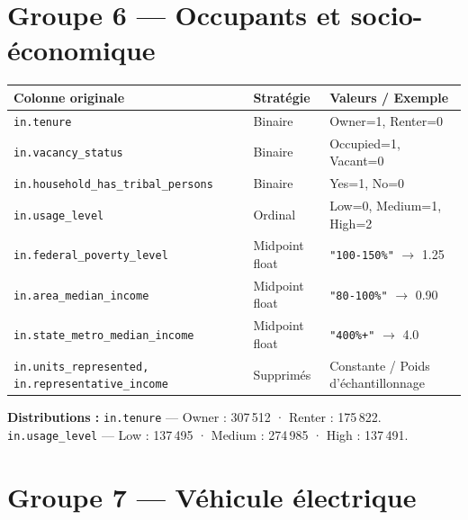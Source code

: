 \documentclass[11pt,a4paper]{article}
\begin{document}
\section{Groupe 6 — Occupants et socio-économique}

\begin{longtable}{L{5.2cm}L{3.5cm}L{5.3cm}}
\toprule
\textbf{Colonne originale} & \textbf{Stratégie} & \textbf{Valeurs / Exemple} \\
\midrule
\endhead
{}
\texttt{in.tenure} & Binaire & Owner=1, Renter=0 \\
\texttt{in.vacancy\_status} & Binaire & Occupied=1, Vacant=0 \\
\texttt{in.household\_has\_tribal\_persons} & Binaire & Yes=1, No=0 \\
\texttt{in.usage\_level} & Ordinal & Low=0, Medium=1, High=2 \\
\texttt{in.federal\_poverty\_level} & Midpoint float & \texttt{"100-150\%"} $\to$ 1.25 \\
\texttt{in.area\_median\_income} & Midpoint float & \texttt{"80-100\%"} $\to$ 0.90 \\
\texttt{in.state\_metro\_median\_income} & Midpoint float & \texttt{"400\%+"} $\to$ 4.0 \\
\texttt{in.units\_represented, in.representative\_income}
  & Supprimés & Constante / Poids d'échantillonnage \\
\bottomrule
\end{longtable}

\noindent\textbf{Distributions :}
\texttt{in.tenure} — Owner : 307\,512 · Renter : 175\,822.\quad
\texttt{in.usage\_level} — Low : 137\,495 · Medium : 274\,985 · High : 137\,491.

\section{Groupe 7 — Véhicule électrique}
\end{document}
